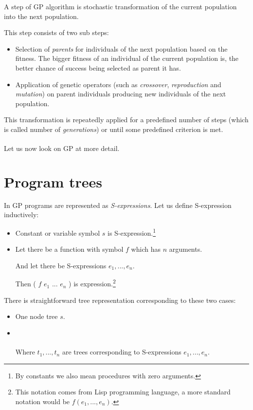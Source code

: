 \documentclass[12pt,a4paper]{report}
\newcommand{\Lets}{Let us\xspace}
\begin{document}
A step of GP algorithm is stochastic transformation of the current population into 	
the next population.

This step consists of two sub steps:
\begin{itemize} 
	\item Selection of \textit{parents} for individuals of the next population based on the fitness.
	      The bigger fitness of an individual of the current population is, 
	      the better chance of success being selected as parent it has.  
	\item Application of genetic operators (such as \textit{crossover}, 
	      \textit{reproduction} and \textit{mutation}) 
		  on parent individuals producing new individuals of the next population.  
\end{itemize}	  
This transformation is repeatedly applied for a predefined number of steps (which is called 
number of \textit{generations}) or until some predefined criterion is met.	
\\\\
\Lets now look on GP at more detail. 


\section{Program trees}

In GP programs are represented as \textit{S-expressions}. 
\Lets define S-expression inductively:

\begin{samepage}
\begin{itemize}
	\item Constant or variable symbol $s$ is S-expression.\footnote{
	      By constants we also mean procedures with zero arguments.}
	\item Let there be a function with symbol $f$ which has $n$ arguments.
	 
	      And let there be S-expressions $e_{1}, ..., e_{n}$. 
	      
	      Then ( $f$ $e_{1}$ ... $e_{n}$ ) is expression.\footnote{
	      This notation comes from Lisp programming language, 
	      a more standard notation would be $f(e_{1}, ... ,e_{n})$.}   
\end{itemize}
\end{samepage}

There is straightforward tree representation corresponding to these two cases:

\begin{itemize}
	\item One node tree $s$.
    \item {}\\\\
		 Where $t_{1}, ..., t_{n}$ are trees corresponding 
		 to S-expressions $e_{1}, ..., e_{n}$.	   
\end{itemize}
\end{document}
